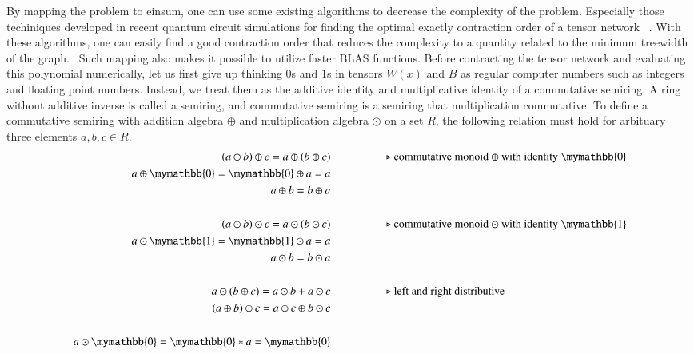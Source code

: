 \documentclass{article}
\newcommand{\<}{\langle}
\renewcommand{\>}{\rangle}
\renewcommand{\cite}[1]{{\citep{#1}}}
\theoremstyle{definition}\newtheorem{definition}{\textit{Definition}}
\begin{document}
By mapping the problem to einsum, one can use some existing algorithms to decrease the complexity of the problem.
Especially those techiniques developed in recent quantum circuit simulations for finding the optimal exactly contraction order of a tensor network ~\cite{Gray2021,Pan2021}.
With these algorithms, one can easily find a good contraction order that reduces the complexity to a quantity related to the minimum treewidth of the graph.~\cite{Markov2008}
Such mapping also makes it possible to utilize faster BLAS functions.
Before contracting the tensor network and evaluating this polynomial numerically, let us first give up thinking $0$s and $1$s in tensors $W(x)$ and $B$ as regular computer numbers such as integers and floating point numbers.
Instead, we treat them as the additive identity and multiplicative identity of a commutative semiring.
A ring without additive inverse is called a semiring, and commutative semiring is a semiring that multiplication commutative.
To define a commutative semiring with addition algebra $\oplus$ and multiplication algebra $\odot$ on a set $R$, the following relation must hold for arbituary three elements $a, b, c \in R$.
\begin{align*}
(a \oplus b) \oplus c = a \oplus (b \oplus c) & \hspace{5em}\text{$\triangleright$ commutative monoid $\oplus$ with identity $\mymathbb{0}$}\\
a \oplus \mymathbb{0} = \mymathbb{0} \oplus a = a &\\
a \oplus b = b \oplus a &\\
&\\
(a \odot b) \odot c = a \odot (b \odot c)  &   \hspace{5em}\text{$\triangleright$ commutative monoid $\odot$ with identity $\mymathbb{1}$}\\
a \odot  \mymathbb{1} =  \mymathbb{1} \odot a = a &\\
a \odot b = b \odot a &\\
&\\
a \odot (b\oplus c) = a\odot b + a\odot c  &  \hspace{5em}\text{$\triangleright$ left and right distributive}\\
(a\oplus b) \odot c = a\odot c \oplus b\odot c &\\
&\\
a \odot \mymathbb{0} = \mymathbb{0} * a = \mymathbb{0}
\end{align*}
\end{document}

